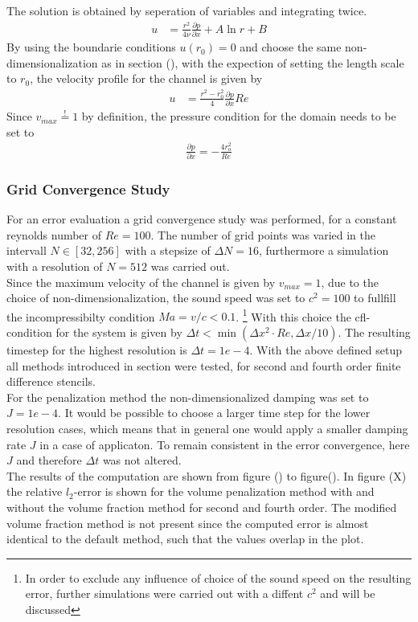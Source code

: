 The solution is obtained by seperation of variables and integrating twice.
\begin{align}
    u &= \frac{r^2}{4\nu}\frac{\partial p}{\partial x} + A \ln r + B
\end{align}
By using the boundarie conditions $u(r_0) = 0$ and choose the same non-dimensionalization as in section (), with the expection of setting the length scale to $r_0$,
the velocity profile for the channel is given by
\begin{align}
    u &= \frac{r^2 - r_0^2}{4}\frac{\partial p}{\partial x}Re
\end{align}
Since $v_{max} \stackrel{!}{=} 1$ by definition, the pressure condition for the domain needs to be set to
\begin{align}
    \frac{\partial p}{\partial x} = -\frac{4 r_o^2}{Re}
\end{align}

\subsubsection{Grid Convergence Study}

For an error evaluation a grid convergence study was performed, for a constant reynolds number of $Re=100$.
The number of grid points was varied in the intervall $N\in[32, 256]$ with a stepsize of $\Delta N = 16$, furthermore a
simulation with a resolution of $N=512$ was carried out.\\
Since the maximum velocity of the channel is given by $v_{max}=1$, due to the choice of non-dimensionalization,
the sound speed was set to $c^2 = 100$ to fullfill the incompressibilty condition $Ma = v/c < 0.1$. \footnote{In order to exclude
any influence of choice of the sound speed on the resulting error, further simulations were carried out with a diffent $c^2$ and will be discussed}
With this choice the cfl-condition for the system is given by $\Delta t < \min(\Delta x^2 \cdot Re, \Delta x / 10)$.
The resulting timestep for the highest resolution is $\Delta t = 1e-4$.
With the above defined setup all methods introduced in section were tested, for second and fourth order finite difference stencils.\\
For the penalization method the non-dimensionalized damping was set to $J=1e-4$.
It would be possible to choose a larger time step for the lower resolution cases, which means that in general
one would apply a smaller damping rate $J$ in a case of applicaton. To remain consistent in the error convergence, here $J$ and
therefore $\Delta t$ was not altered.\\
The results of the computation are shown from figure () to figure().
In figure (X) the relative $l_2$-error is shown for the volume penalization method with and without the volume fraction method
for second and fourth order. The modified volume fraction method is not present since the computed error is almost identical to the default method,
such that the values overlap in the plot.

